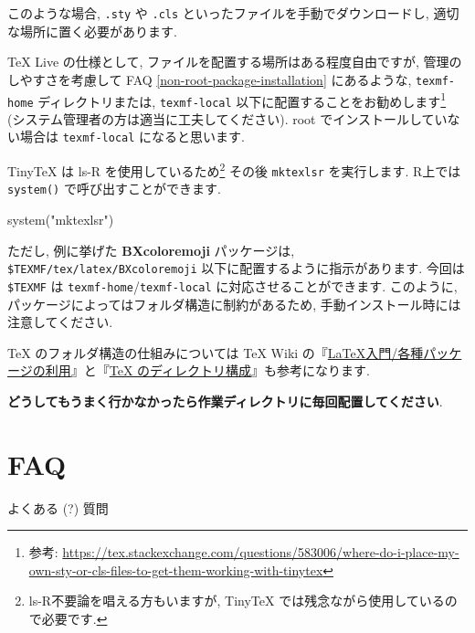 \documentclass[
  xelatex,ja=standard,jafont=noto]{bxjsreport}
\newenvironment{Shaded}{\begin{snugshade}}{\end{snugshade}}
\newcommand{\FunctionTok}[1]{\textcolor[rgb]{0.00,0.00,0.00}{#1}}
\newcommand{\NormalTok}[1]{#1}
\newcommand{\StringTok}[1]{\textcolor[rgb]{0.31,0.60,0.02}{#1}}
\begin{document}
このような場合, \texttt{.sty} や \texttt{.cls}
といったファイルを手動でダウンロードし, 適切な場所に置く必要があります.

TeX Live の仕様として, ファイルを配置する場所はある程度自由ですが,
管理のしやすさを考慮して FAQ \ref{non-root-package-installation}
にあるような, \texttt{texmf-home} ディレクトリまたは,
\texttt{texmf-local} 以下に配置することをお勧めします\footnote{参考:
  \url{https://tex.stackexchange.com/questions/583006/where-do-i-place-my-own-sty-or-cls-files-to-get-them-working-with-tinytex}}
(システム管理者の方は適当に工夫してください). root
でインストールしていない場合は \texttt{texmf-local} になると思います.

TinyTeX は ls-R を使用しているため\footnote{ls-R不要論を唱える方もいますが,
  TinyTeX では残念ながら使用しているので必要です.} その後
\texttt{mktexlsr} を実行します. R上では \texttt{system()}
で呼び出すことができます.

\begin{Shaded}
\begin{Highlighting}[numbers=left,,]
\FunctionTok{system}\NormalTok{(}\StringTok{"mktexlsr"}\NormalTok{)}
\end{Highlighting}
\end{Shaded}

ただし, 例に挙げた \textbf{BXcoloremoji} パッケージは,
\texttt{\$TEXMF/tex/latex/BXcoloremoji}
以下に配置するように指示があります. 今回は \texttt{\$TEXMF} は
\texttt{texmf-home}/\texttt{texmf-local} に対応させることができます.
このように, パッケージによってはフォルダ構造に制約があるため,
手動インストール時には注意してください.

TeX のフォルダ構造の仕組みについては TeX Wiki
の『\href{https://texwiki.texjp.org/?LaTeX\%E5\%85\%A5\%E9\%96\%80\%2F\%E5\%90\%84\%E7\%A8\%AE\%E3\%83\%91\%E3\%83\%83\%E3\%82\%B1\%E3\%83\%BC\%E3\%82\%B8\%E3\%81\%AE\%E5\%88\%A9\%E7\%94\%A8}{LaTeX入門/各種パッケージの利用}』と『\href{https://texwiki.texjp.org/?TeX\%20\%E3\%81\%AE\%E3\%83\%87\%E3\%82\%A3\%E3\%83\%AC\%E3\%82\%AF\%E3\%83\%88\%E3\%83\%AA\%E6\%A7\%8B\%E6\%88\%90}{TeX
のディレクトリ構成}』も参考になります.

\textbf{どうしてもうまく行かなかったら作業ディレクトリに毎回配置してください}.

\hypertarget{faq}{%
\chapter{FAQ}\label{faq}}

よくある (?) 質問
\end{document}
